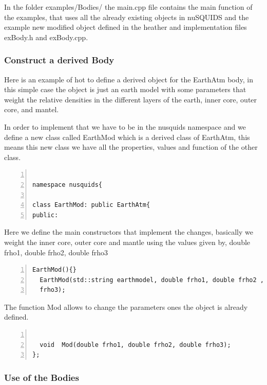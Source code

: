 In the folder {\ttf examples/Bodies/} the {\ttf main.cpp} file
contains the main function of the examples, that uses all the already
existing objects in nuSQUIDS and the example new modified object
defined in the heather and implementation files {\ttf exBody.h} and
{\ttf exBody.cpp}.

\subsubsection{Construct a derived Body}

Here is an example of hot to define a derived object for the EarthAtm
body, in this simple case the object is just an earth model with some
parameters that weight the relative densities in the different layers
of the earth, inner core, outer core, and mantel.

In order to implement that we have to be in the {\ttf nusquids} namespace and we define a
new class called {\ttf EarthMod} which is a derived class of {\ttf
  EarthAtm}, this means this new class we have all the properties,
values and function of the other class. 
\begin{lstlisting}[frame=leftline, numbers = left,breaklines=true,label = ex:sin1]

namespace nusquids{

class EarthMod: public EarthAtm{
public:
\end{lstlisting}
Here we define the main constructors that implement the changes,
basically we weight the inner core, outer core and mantle using the
values given by, {\ttf double frho1}, {\ttf double frho2}, {\ttf
  double frho3}
\begin{lstlisting}[frame=leftline, numbers = left,breaklines=true,label = ex:sin1,firstnumber=last]
  EarthMod(){}
  EarthMod(std::string earthmodel, double frho1, double frho2 , double
  frho3);
\end{lstlisting}
The function {\ttf Mod} allows to change the parameters ones the
object is already defined.
\begin{lstlisting}[frame=leftline, numbers =
  left,breaklines=true,label = ex:sin1,firstnumber=last]

  void  Mod(double frho1, double frho2, double frho3);
};

\end{lstlisting}

\subsubsection{Use of the Bodies}


